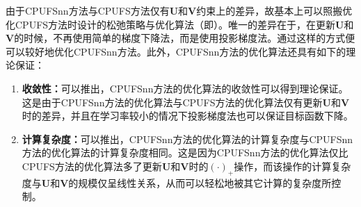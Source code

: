 由于CPUFSnn方法与CPUFS方法仅有$\boldsymbol{U}$和$\boldsymbol{V}$约束上的差异，故基本上可以照搬优化CPUFS方法时设计的松弛策略与优化算法（即）。唯一的差异在于，在更新$\boldsymbol{U}$和$\boldsymbol{V}$的时候，不再使用简单的梯度下降法，而是使用投影梯度法。通过这样的方式便可以较好地优化CPUFSnn方法。此外，CPUFSnn方法的优化算法还具有如下的理论保证：
\begin{enumerate}
    \item \textbf{收敛性：}可以推出，CPUFSnn方法的优化算法的收敛性可以得到理论保证。这是由于CPUFSnn方法的优化算法与CPUFS方法的优化算法仅有更新$\boldsymbol{U}$和$\boldsymbol{V}$时的差异，并且在学习率较小的情况下投影梯度法也可以保证目标函数下降。
    \item \textbf{计算复杂度：}可以推出，CPUFSnn方法的优化算法的计算复杂度与CPUFSnn方法的优化算法的计算复杂度相同。这是因为CPUFSnn方法的优化算法仅比CPUFS方法的优化算法多了更新$\boldsymbol{U}$和$\boldsymbol{V}$时的$(\cdot)_{+}$操作，而该操作的计算复杂度与$\boldsymbol{U}$和$\boldsymbol{V}$的规模仅呈线性关系，从而可以轻松地被其它计算的复杂度所控制。
\end{enumerate}



